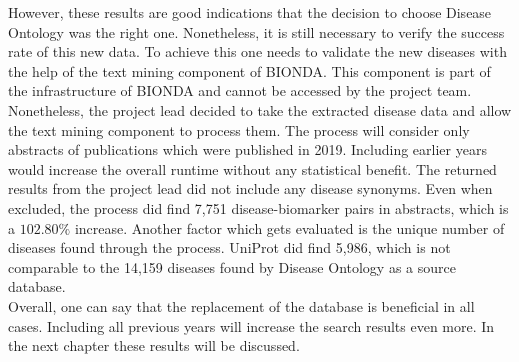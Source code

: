 However, these results are good indications that the decision to choose Disease Ontology was the right one. Nonetheless, it is still necessary to verify the success rate of this new data. To achieve this one needs to validate the new diseases with the help of the text mining component of BIONDA. This component is part of the infrastructure of BIONDA and cannot be accessed by the project team. Nonetheless, the project lead decided to take the extracted disease data and allow the text mining component to process them. The process will consider only abstracts of publications which were published in 2019. Including earlier years would increase the overall runtime without any statistical benefit. The returned results from the project lead did not include any disease synonyms. Even when excluded, the process did find 7,751 disease-biomarker pairs in abstracts, which is a $102.80\%$ increase. Another factor which gets evaluated is the unique number of diseases found through the process. \ac{UniProt} did find 5,986, which is not comparable to the 14,159 diseases found by Disease Ontology as a source database.\\

Overall, one can say that the replacement of the database is beneficial in all cases. Including all previous years will increase the search results even more. In the next chapter these results will be discussed.
